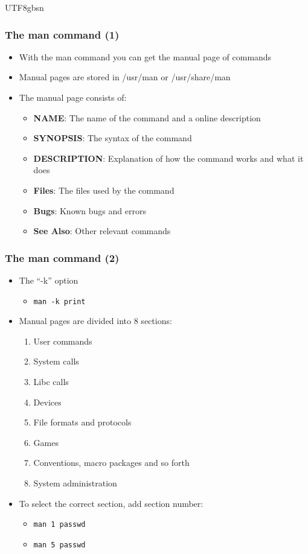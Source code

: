 \documentclass[red]{beamer}
\begin{document}
\begin{CJK*}{UTF8}{gbsn}
\begin{frame}
\frametitle{The man command (1)}
\begin{itemize}
    \item With the man command you can get the manual page of commands
    \item Manual pages are stored in /usr/man or /usr/share/man
    \item The manual page consists of:
    \begin{itemize}
        \item \textbf{NAME}: The name of the command and a online description
        \item \textbf{SYNOPSIS}: The syntax of the command
        \item \textbf{DESCRIPTION}: Explanation of how the command works and what it does
        \item \textbf{Files}: The files used by the command
        \item \textbf{Bugs}: Known bugs and errors
        \item \textbf{See Also}: Other relevant commands
    \end{itemize}
\end{itemize}
\end{frame}

\begin{frame}
\frametitle{The man command (2)}
\begin{itemize}
    \item The ``-k'' option
    \begin{itemize}
        \item \lstinline{man -k print}
    \end{itemize}
    \item Manual pages are divided into 8 sections:
    \begin{enumerate}
        \item User commands
        \item System calls
        \item Libc calls
        \item Devices
        \item File formats and protocols
        \item Games
        \item Conventions, macro packages and so forth
        \item System administration
    \end{enumerate}
    \item To select the correct section, add section number:
    \begin{itemize}
        \item \lstinline{man 1 passwd}
        \item \lstinline{man 5 passwd}
    \end{itemize}
\end{itemize}
\end{frame}


\end{CJK*}
\end{document}
